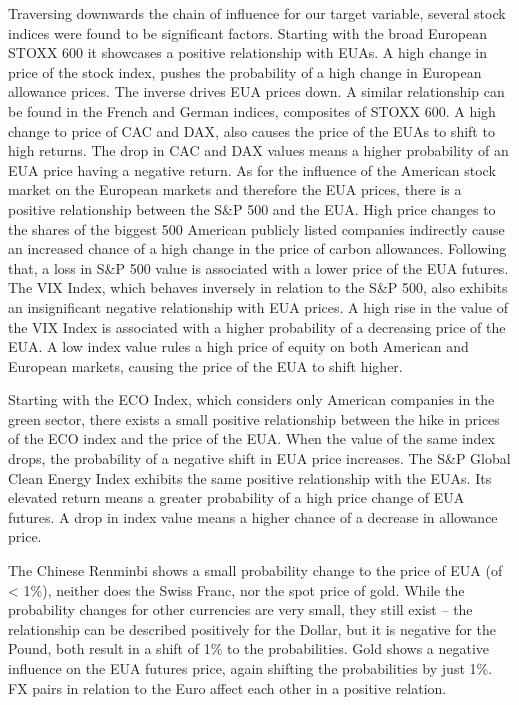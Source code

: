 \documentclass[12pt, letterpaper]{article}
\begin{document}
Traversing downwards the chain of influence for our target variable, several stock indices were found to be significant factors. Starting with the broad European STOXX 600 it showcases a positive relationship with EUAs. A high change in price of the stock index, pushes the probability of a high change in European allowance prices. The inverse drives EUA prices down. A similar relationship can be found in the French and German indices, composites of STOXX 600. A high change to price of CAC and DAX, also causes the price of the EUAs to shift to high returns. The drop in CAC and DAX values means a higher probability of an EUA price having a negative return. As for the influence of the American stock market on the European markets and therefore the EUA prices, there is a positive relationship between the S\&P 500 and the EUA. High price changes to the shares of the biggest 500 American publicly listed companies indirectly cause an increased chance of a high change in the price of carbon allowances. Following that, a loss in S\&P 500 value is associated with a lower price of the EUA futures. The VIX Index, which behaves inversely in relation to the S\&P 500, also exhibits an insignificant negative relationship with EUA prices. A high rise in the value of the VIX Index is associated with a higher probability of a decreasing price of the EUA. A low index value rules a high price of equity on both American and European markets, causing the price of the EUA to shift higher.

Starting with the ECO Index, which considers only American companies in the green sector, there exists a small positive relationship between the hike in prices of the ECO index and the price of the EUA. When the value of the same index drops, the probability of a negative shift in EUA price increases. The S\&P Global Clean Energy Index exhibits the same positive relationship with the EUAs. Its elevated return means a greater probability of a high price change of EUA futures. A drop in index value means a higher chance of a decrease in allowance price.

The Chinese Renminbi shows a small probability change to the price of EUA (of < 1\%), neither does the Swiss Franc, nor the spot price of gold. While the probability changes for other currencies are very small, they still exist – the relationship can be described positively for the Dollar, but it is negative for the Pound, both result in a shift of 1\% to the probabilities. Gold shows a negative influence on the EUA futures price, again shifting the probabilities by just 1\%. FX pairs in relation to the Euro affect each other in a positive relation.
\end{document}
